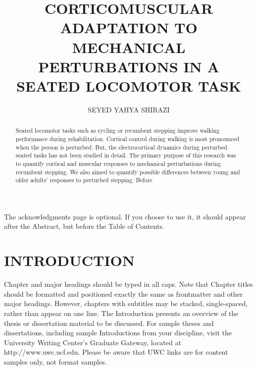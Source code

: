 \documentclass{UCF_ETD}
\title{\uppercase{Corticomuscular adaptation to mechanical perturbations in a seated locomotor task}} %
\author{\uppercase{Seyed Yahya Shirazi}} %
\begin{document}
\frontmatter

\maketitle


\begin{abstract}
Seated locomotor tasks such as cycling or recumbent stepping improve walking performance during rehabilitation. Cortical control during walking is most pronounced when the person is perturbed. But, the electrocortical dynamics during perturbed seated tasks has not been studied in detail. The primary purpose of this research was to quantify cortical and muscular responses to mechanical perturbations during recumbent stepping. We also aimed to quantify possible differences between young and older adults' responses to perturbed stepping. Before 
\end{abstract}

\dedication{Dedicated to my love, Maryam.}

\begin{acknowledgments}
The acknowledgments page is optional. If you choose to use it, it should appear after the Abstract, but before the Table of Contents.
\end{acknowledgments}

\tableofcontents

\listoffigures

\listoftables

\mainmatter

\chapter{INTRODUCTION} 
Chapter and major headings should be typed in all caps.  Note that Chapter titles should be formatted and positioned exactly the same as frontmatter and other major headings. However, chapters with subtitles may be stacked, single-spaced, rather than appear on one line.
The Introduction presents an overview of the thesis or dissertation material to be discussed. For sample theses and dissertations, including sample Introductions from your discipline, visit the University Writing Center’s Graduate Gateway, located at http://www.uwc.ucf.edu. Please be aware that UWC links are for content samples only, not format samples.
\end{document}
